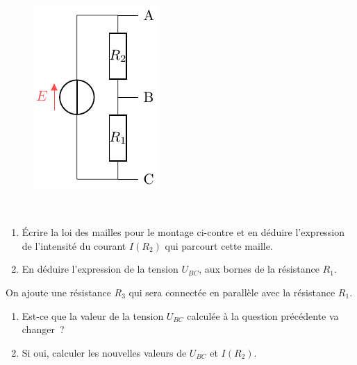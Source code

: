 \documentclass[../../main/main.tex]{subfiles}
\begin{document}
\begin{figure}
	\centering
	\includegraphics[width=\linewidth]{divtens_plain}
\end{figure}
~
\begin{enumerate}
	\item Écrire la loi des mailles pour le montage ci-contre et en déduire
	      l'expression de l'intensité du courant $I(R_2)$ qui parcourt cette
	      maille.
	\item En déduire l'expression de la tension $U_{BC}$, aux bornes de la
	      résistance $R_1$.
\end{enumerate}
On ajoute une résistance $R_3$ qui sera connectée en parallèle avec la
résistance $R_1$.
\begin{enumerate}[resume]
	\item Est-ce que la valeur de la tension $U_{BC}$ calculée à la question
	      précédente va changer~?
	\item Si oui, calculer les nouvelles valeurs de $U_{BC}$ et $I(R_2)$.
\end{enumerate}
\end{document}
